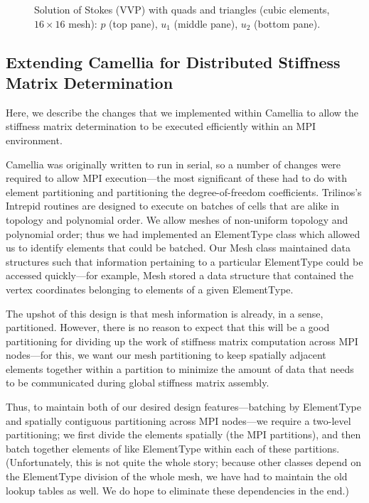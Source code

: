 \begin{figure}[h!b!h!]
\begin{center}
\caption{Solution of Stokes (VVP) with quads and triangles (cubic elements, $16 \times 16$ mesh):
$p$ (top pane),
$u_{1}$ (middle pane),
$u_{2}$ (bottom pane).}
\label{NVR:fig:Stokes}
\end{center}\end{figure}

\clearpage

\subsection{Extending Camellia for Distributed Stiffness Matrix Determination}\label{sec:distributingStiffness}
Here, we describe the changes that we implemented within Camellia to allow the stiffness matrix determination to be executed efficiently within an MPI environment.

Camellia was originally written to run in serial, so a number of changes were required to allow MPI execution---the most significant of these had to do with element partitioning and partitioning the degree-of-freedom coefficients.  Trilinos's Intrepid routines are designed to execute on batches of cells that are alike in topology and polynomial order.  We allow meshes of non-uniform topology and polynomial order; thus we had implemented an ElementType class which allowed us to identify elements that could be batched.  Our Mesh class maintained data structures such that information pertaining to a particular ElementType could be accessed quickly---for example, Mesh stored a data structure that contained the vertex coordinates belonging to elements of a given ElementType.

The upshot of this design is that mesh information is already, in a sense, partitioned.  However, there is no reason to expect that this will be a good partitioning for dividing up the work of stiffness matrix computation across MPI nodes---for this, we want our mesh partitioning to keep spatially adjacent elements together within a partition to minimize the amount of data that needs to be communicated during global stiffness matrix assembly.

Thus, to maintain both of our desired design features---batching by ElementType and spatially contiguous partitioning across MPI nodes---we require a two-level partitioning; we first divide the elements spatially (the MPI partitions), and then batch together elements of like ElementType within each of these partitions.  (Unfortunately, this is not quite the whole story; because other classes depend on the ElementType division of the whole mesh, we have had to maintain the old lookup tables as well.  We do hope to eliminate these dependencies in the end.)

